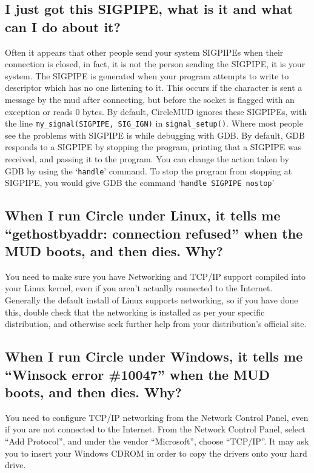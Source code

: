 \documentclass[11pt]{article}
\begin{document}
\subsection{I just got this SIGPIPE, what is it and what can I do about it?}
Often it appears that other people send your system SIGPIPEs when their connection is closed, in fact, it is not the person sending the SIGPIPE, it is your system.  The SIGPIPE is generated when your program attempts to write to descriptor which has no one listening to it.  This occurs if the character is sent a message by the mud after connecting, but before the socket is flagged with an exception or reads 0 bytes. By default, CircleMUD ignores these SIGPIPEs, with the line \texttt{my\_signal(SIGPIPE, SIG\_IGN)} in \texttt{signal\_setup()}.  Where most people see the problems with SIGPIPE is while debugging with GDB.  By default, GDB responds to a SIGPIPE by stopping the program, printing that a SIGPIPE was received, and passing it to the program.  You can change the action taken by GDB by using the `\texttt{handle}' command. To stop the program from stopping at SIGPIPE, you would give GDB the command `\texttt{handle SIGPIPE nostop}'

\subsection{When I run Circle under Linux, it tells me ``gethostbyaddr: connection refused'' when the MUD boots, and then dies.  Why?}
You need to make sure you have Networking and TCP/IP support compiled into your Linux kernel, even if you aren't actually connected to the Internet.  Generally the default install of Linux supports networking, so if you have done this, double check that the networking is installed as per your specific distribution, and otherwise seek further help from your distribution's official site.

\subsection{When I run Circle under Windows, it tells me ``Winsock error \#10047'' when the MUD boots, and then dies.  Why?}
You need to configure TCP/IP networking from the Network Control Panel, even if you are not connected to the Internet.  From the Network Control Panel, select ``Add Protocol'', and under the vendor ``Microsoft'', choose ``TCP/IP''.  It may ask you to insert your Windows CDROM in order to copy the drivers onto your hard drive.
\end{document}

